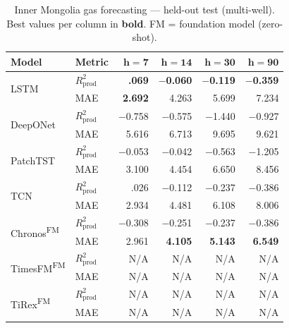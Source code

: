 \documentclass[11pt]{article}
\newcommand{\best}[1]{\textbf{#1}}
\newcommand{\fm}{\textsuperscript{FM}}
\newcommand{\rp}{R^2_\text{prod}}
\begin{document}
\begin{table}[ht]
\centering
\caption{Inner Mongolia gas forecasting — held-out test (multi-well).
Best values per column in \textbf{bold}.
FM = foundation model (zero-shot).}
\label{tab:im_main}
\small
\setlength{\tabcolsep}{2.5pt}
\begin{tabular}{@{}ll rrrr @{}}
\toprule
\textbf{Model} & \textbf{Metric} & $\boldsymbol{h{=}7}$ & $\boldsymbol{h{=}14}$ & $\boldsymbol{h{=}30}$ & $\boldsymbol{h{=}90}$ \\
\midrule
\multirow{2}{*}{LSTM}
 & $\rp$ & \best{.069} & \best{$-$0.060} & \best{$-$0.119} & \best{$-$0.359} \\
 & MAE   & \best{2.692} & 4.263 & 5.699 & 7.234 \\
\midrule
\multirow{2}{*}{DeepONet}
 & $\rp$ & $-$0.758 & $-$0.575 & $-$1.440 & $-$0.927 \\
 & MAE   & 5.616 & 6.713 & 9.695 & 9.621 \\
\midrule
\multirow{2}{*}{PatchTST}
 & $\rp$ & $-$0.053 & $-$0.042 & $-$0.563 & $-$1.205 \\
 & MAE   & 3.100 & 4.454 & 6.650 & 8.456 \\
\midrule
\multirow{2}{*}{TCN}
 & $\rp$ & .026 & $-$0.112 & $-$0.237 & $-$0.386 \\
 & MAE   & 2.934 & 4.481 & 6.108 & 8.006 \\
\midrule
\multirow{2}{*}{Chronos\fm}
 & $\rp$ & $-$0.308 & $-$0.251 & $-$0.237 & $-$0.386 \\
 & MAE   & 2.961 & \best{4.105} & \best{5.143} & \best{6.549} \\
\midrule
\multirow{2}{*}{TimesFM\fm}
 & $\rp$ & N/A & N/A & N/A & N/A \\
 & MAE   & N/A & N/A & N/A & N/A \\
\midrule
\multirow{2}{*}{TiRex\fm}
 & $\rp$ & N/A & N/A & N/A & N/A \\
 & MAE   & N/A & N/A & N/A & N/A \\
\bottomrule
\end{tabular}
\end{table}
\end{document}
